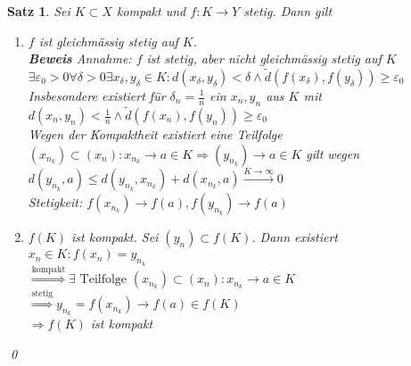 \documentclass[ngerman,titlepage,twoside, parskip=half*]{scrreprt}
\theoremstyle{break}
\newtheorem{theorem}{Satz}[section]
\theoremstyle{nonumberbreak}
\begin{document}
\begin{theorem}
\label{satz:gleichm-stetig}
Sei $K\subset X$ kompakt und $f\colon K\rightarrow Y$ stetig. Dann gilt
\begin{enumerate}[(1)]
  \item $f$ ist gleichmässig stetig auf $K$.\\
    \textbf{Beweis} Annahme: $f$ ist stetig, aber nicht gleichmässig stetig auf $K$\\
    $\exists \varepsilon_0>0 \forall \delta >0 \exists x_{\delta},y_{\delta}\in K\colon d(x_{\delta},
    y_{\delta})<\delta\wedge\tilde{d}(f(x_{\delta}),f(y_{\delta}))\geq \varepsilon_0$\\
    Insbesondere existiert für $\delta_n=\frac{1}{n}$ ein $x_n,y_n$ aus $K$ mit \\
    $d(x_n,y_n)<\frac{1}{n}
    \wedge \tilde{d}(f(x_n),f(y_n))\geq \varepsilon_0$\\
    Wegen der Kompaktheit existiert eine Teilfolge $(x_{n_k})\subset (x_n)\colon x_{n_k}\rightarrow a\in K
    \Rightarrow (y_{n_k})\rightarrow a\in K$ gilt wegen $d(y_{n_k},a)\leq d(y_{n_k},x_{n_k})+d(x_{n_k},a)
    \stackrel{K\rightarrow\infty}{\rightarrow}0$\\
    Stetigkeit: $f(x_{n_k})\rightarrow f(a), f(y_{n_k})\rightarrow f(a)$\textnormal{\lightning}
  \item $f(K)$  ist kompakt.
    Sei $(y_n)\subset f(K)$. Dann existiert $x_n \in K\colon f(x_n)=y_{n_k}$\\
    $\stackrel{\text{kompakt}}{\Rightarrow} \exists \text{ Teilfolge } (x_{n_k})\subset (x_n)\colon x_{n_k}\rightarrow
    a \in K$\\
    $\stackrel{\text{stetig}}{\Rightarrow} y_{n_k}=f(x_{n_k})\rightarrow f(a) \in f(K)$\\
    $\Rightarrow f(K)$ ist kompakt
\end{enumerate}
\qed
\end{theorem}
\end{document}
